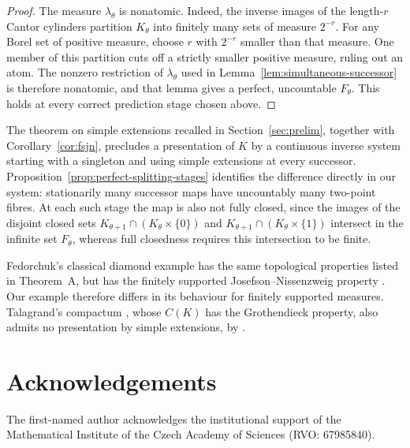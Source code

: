 \documentclass[a4paper,11pt]{amsart}
\theoremstyle{plain}
\theoremstyle{definition}
\theoremstyle{remark}
\numberwithin{equation}{section}
\begin{document}
\begin{proof}
The measure $\lambda_\theta$ is nonatomic. Indeed, the inverse images of the length-$r$ Cantor cylinders partition $K_\theta$ into finitely many sets of measure $2^{-r}$. For any Borel set of positive measure, choose $r$ with $2^{-r}$ smaller than that measure. One member of this partition cuts off a strictly smaller positive measure, ruling out an atom. The nonzero restriction of $\lambda_\theta$ used in Lemma~\ref{lem:simultaneous-successor} is therefore nonatomic, and that lemma gives a perfect, uncountable $F_\theta$. This holds at every correct prediction stage chosen above.
\end{proof}

The theorem on simple extensions recalled in Section~\ref{sec:prelim}, together with Corollary~\ref{cor:fsjn}, precludes a presentation of $K$ by a continuous inverse system starting with a singleton and using simple extensions at every successor. Proposition~\ref{prop:perfect-splitting-stages} identifies the difference directly in our system: stationarily many successor maps have uncountably many two-point fibres. At each such stage the map is also not fully closed, since the images of the disjoint closed sets $K_{\theta+1}\cap(K_\theta\times\{0\})$ and $K_{\theta+1}\cap(K_\theta\times\{1\})$ intersect in the infinite set $F_\theta$, whereas full closedness requires this intersection to be finite.

Fedorchuk's classical diamond example \cite{Fedorchuk} has the same topological properties listed in Theorem~A, but has the finitely supported Josefson--Nissenzweig property \cite[Corollary~6.12]{KSZ}. Our example therefore differs in its behaviour for finitely supported measures. Talagrand's compactum \cite{Talagrand}, whose $C(K)$ has the Grothendieck property, also admits no presentation by simple extensions, by \cite[Theorems~4.1 and 6.10]{KSZ}.

\section*{Acknowledgements}
The first-named author acknowledges the institutional support of the Mathematical Institute of the Czech Academy of Sciences (RVO: 67985840).
\end{document}
